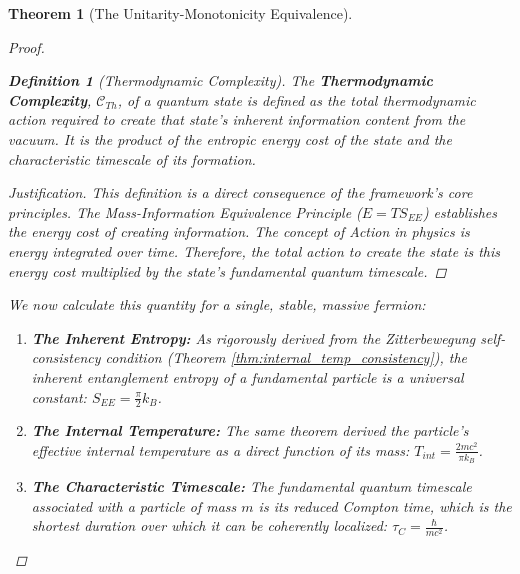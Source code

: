 \documentclass[11pt, letterpaper]{report}
\theoremstyle{plain} %
\newtheorem{theorem}{Theorem}[chapter]
\theoremstyle{definition} %
\newtheorem{definition}{Definition}[chapter]
\theoremstyle{remark} %
\begin{document}
\begin{theorem}[The Unitarity-Monotonicity Equivalence]
\begin{proof}
\begin{definition}[Thermodynamic Complexity]
The \textbf{Thermodynamic Complexity}, $\mathcal{C}_{Th}$, of a quantum state is defined as the total thermodynamic action required to create that state's inherent information content from the vacuum. It is the product of the entropic energy cost of the state and the characteristic timescale of its formation.
\end{definition}
\begin{proof}[Justification]
This definition is a direct consequence of the framework's core principles. The Mass-Information Equivalence Principle ($E = T S_{EE}$) establishes the energy cost of creating information. The concept of Action in physics is energy integrated over time. Therefore, the total action to create the state is this energy cost multiplied by the state's fundamental quantum timescale.
\end{proof}

We now calculate this quantity for a single, stable, massive fermion:
\begin{enumerate}
    \item \textbf{The Inherent Entropy:} As rigorously derived from the Zitterbewegung self-consistency condition (Theorem \ref{thm:internal_temp_consistency}), the inherent entanglement entropy of a fundamental particle is a universal constant: $S_{EE} = \frac{\pi}{2} k_B$.

    \item \textbf{The Internal Temperature:} The same theorem derived the particle's effective internal temperature as a direct function of its mass: $T_{int} = \frac{2mc^2}{\pi k_B}$.

    \item \textbf{The Characteristic Timescale:} The fundamental quantum timescale associated with a particle of mass $m$ is its reduced Compton time, which is the shortest duration over which it can be coherently localized: $\tau_C = \frac{\hbar}{mc^2}$.


\end{enumerate}
\end{proof}
\end{theorem}
\end{document}
